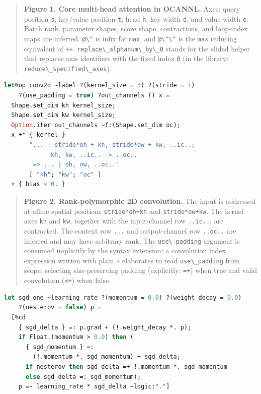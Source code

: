 \documentclass[
  10pt,
  letterpaper,
]{article}
\newcommand{\passthrough}[1]{#1}
\begin{document}
\begin{quote}
\textbf{Figure 1. Core multi-head attention in OCANNL.} Axes: query
position \passthrough{\lstinline!s!}, key/value position
\passthrough{\lstinline!t!}, head \passthrough{\lstinline!h!}, key width
\passthrough{\lstinline!d!}, and value width
\passthrough{\lstinline!e!}. Batch rank, parameter shapes, score shape,
contractions, and loop-index maps are inferred.
\passthrough{\lstinline!@\^!} is infix for
\passthrough{\lstinline!max!}, and \passthrough{\lstinline!@\^\^!} is
the \passthrough{\lstinline!max!} reducing equivalent of
\passthrough{\lstinline!++!}.
\passthrough{\lstinline!replace\_alphanum\_by\_0!} stands for the elided
helper that replaces axis identifiers with the fixed index
\passthrough{\lstinline!0!} (in the library:
\passthrough{\lstinline!reduce\_specified\_axes!}).
\end{quote}

\begin{lstlisting}[language=Caml]
let%op conv2d ~label ?(kernel_size = 3) ?(stride = 1)
    ?(use_padding = true) ?out_channels () x =
  Shape.set_dim kh kernel_size;
  Shape.set_dim kw kernel_size;
  Option.iter out_channels ~f:(Shape.set_dim oc);
  x +* { kernel }
       "... | stride*oh + kh, stride*ow + kw, ..ic..;
             kh, kw, ..ic.. -> ..oc..
        => ... | oh, ow, ..oc.."
       [ "kh"; "kw"; "oc" ]
  + { bias = 0. }
\end{lstlisting}

\begin{quote}
\textbf{Figure 2. Rank-polymorphic 2D convolution.} The input is
addressed at affine spatial positions
\passthrough{\lstinline!stride*oh+kh!} and
\passthrough{\lstinline!stride*ow+kw!}. The kernel axes
\passthrough{\lstinline!kh!} and \passthrough{\lstinline!kw!}, together
with the input-channel row \passthrough{\lstinline!..ic..!}, are
contracted. The context row \passthrough{\lstinline!...!} and
output-channel row \passthrough{\lstinline!..oc..!} are inferred and may
have arbitrary rank. The \passthrough{\lstinline!use\_padding!} argument
is consumed implicitly by the syntax extension: a convolution index
expression written with plain \passthrough{\lstinline!+!} elaborates to
read \passthrough{\lstinline!use\_padding!} from scope, selecting
size-preserving padding (explicitly: \passthrough{\lstinline!=+!}) when
true and valid convolution (\passthrough{\lstinline!<+!}) when false.
\end{quote}

\begin{lstlisting}[language=Caml]
let sgd_one ~learning_rate ?(momentum = 0.0) ?(weight_decay = 0.0)
    ?(nesterov = false) p =
  [%cd
    { sgd_delta } =: p.grad + (!.weight_decay *. p);
    if Float.(momentum > 0.0) then (
      { sgd_momentum } =:
        (!.momentum *. sgd_momentum) + sgd_delta;
      if nesterov then sgd_delta =+ !.momentum *. sgd_momentum
      else sgd_delta =: sgd_momentum);
    p =- learning_rate * sgd_delta ~logic:"."]
\end{lstlisting}
\end{document}
